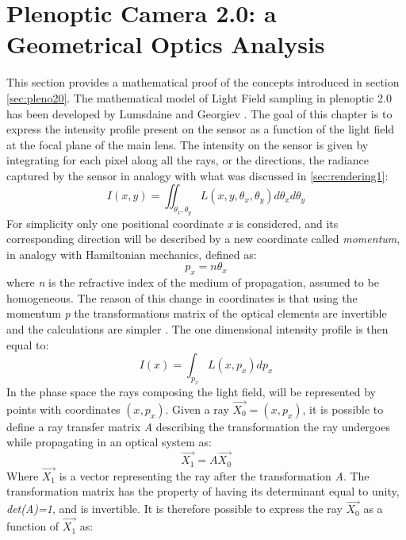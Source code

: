   \section{Plenoptic Camera 2.0: a Geometrical Optics Analysis}
  \label{sec:phase2.0}
  This section provides a mathematical proof of the concepts introduced in section \ref{sec:pleno20}. The mathematical model of Light Field sampling in plenoptic 2.0 has been developed by Lumsdaine and Georgiev \cite{lumsdaine2009focused,lumsdaine2008full}. The goal of this chapter is to express the intensity profile present on the sensor as a function of the light field at the focal plane of the main lens. The intensity on the sensor is given by integrating for each pixel along all the rays, or the directions, the radiance captured by the sensor in analogy with what was discussed in \ref{sec:rendering1}:
  \begin{equation}
 	\label{eq:phase201}
 	I(x,y)=\iint_{\theta_x, \theta_y}L(x,y,\theta_x,\theta_y) d\theta_xd\theta_y
  \end{equation} 
  For simplicity only one positional coordinate \textit{x} is considered, and its corresponding direction will be described by a new coordinate called \textit{momentum}, in analogy with Hamiltonian mechanics, defined as:
  \begin{equation}
	\label{eq:momentum2}
	p_x = n\theta_x
  \end{equation}
  where \textit{n} is the refractive index of the medium of propagation, assumed to be homogeneous. The reason of this change in coordinates is that using the momentum \textit{p} the transformations matrix of the optical elements are invertible and the calculations are simpler \cite{guillemin1990symplectic}. The one dimensional intensity profile is then equal to:
  \begin{equation}
  \label{eq:1Dintensity}
  I(x)=\int_{p_x}L(x,p_x) dp_x
  \end{equation} 
  In the phase space the rays composing the light field, will be represented by points with coordinates $(x,p_x)$. Given a ray $\overrightarrow{X_0}=(x,p_x)$, it is possible to define a ray transfer matrix \textit{A} describing the transformation the ray undergoes while propagating in an optical system as:
  \begin{equation}
  \label{eq:transmatrix1}
  \overrightarrow{X_1}=A\overrightarrow{X_0}
  \end{equation}
  Where $\overrightarrow{X_1}$ is a vector representing the ray after the transformation \textit{A}. The transformation matrix has the property of having its determinant equal to unity, \textit{det(A)=1}, and is invertible. It is therefore possible to express the ray $\overrightarrow{X_0}$ as a function of $\overrightarrow{X_1}$ as:
